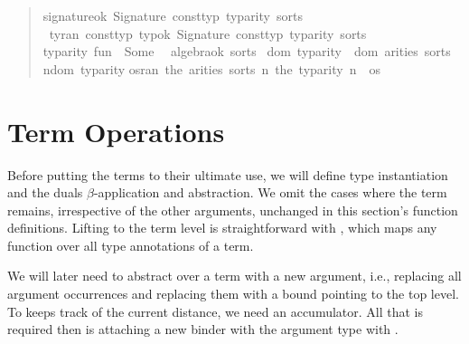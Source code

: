 \begin{quote}
\begin{isabelle}%
 signature{\isacharunderscore}ok\ {\isacharparenleft}Signature\ const{\isacharunderscore}typ\ typ{\isacharunderscore}arity\ sorts{\isacharparenright}\ {\isacharequal}\isanewline
\ {\isacharparenleft}{\isasymforall}ty{\isasymin}ran\ const{\isacharunderscore}typ{\isachardot}\ {\isacharparenleft}typ{\isacharunderscore}ok{\isacharprime}\ {\isacharparenleft}Signature\ const{\isacharunderscore}typ\ typ{\isacharunderscore}arity\ sorts{\isacharparenright}{\isacharparenright}\ {\isasymand}\isanewline
\isaindent{\ }typ{\isacharunderscore}arity\ {\isacharprime}{\isacharprime}fun{\isacharprime}{\isacharprime}\ {\isacharequal}\ Some\ {}\ {\isasymand}\isanewline
\isaindent{\ }algebra{\isacharunderscore}ok\ sorts\ {\isasymand}\isanewline
\isaindent{\ }dom\ typ{\isacharunderscore}arity\ {\isacharequal}\ dom\ {\isacharparenleft}arities\ sorts{\isacharparenright}\ {\isasymand}\isanewline
\isaindent{\ }{\isacharparenleft}{\isasymforall}n{\isasymin}dom\ typ{\isacharunderscore}arity{\isachardot}\isanewline
\isaindent{\ {\isacharparenleft}\ \ \ }{\isasymforall}os{\isasymin}ran\ {\isacharparenleft}the\ {\isacharparenleft}arities\ sorts\ n{\isacharparenright}{\isacharparenright}{\isachardot}\ the\ {\isacharparenleft}typ{\isacharunderscore}arity\ n{\isacharparenright}\ {\isacharequal}\ {\isacharbar}os{\isacharbar}{\isacharparenright}{\isacharparenright}%
\end{isabelle}
\end{quote}

\section{Term Operations}

Before putting the terms to their ultimate use, we will define type instantiation and the duals \(\beta\)-application and abstraction.
We omit the cases where the term remains, irrespective of the other arguments, unchanged in this section's function definitions.
Lifting  to the term level is straightforward with , which maps any function over all type annotations of a term.


We will later need to abstract over a term with a new argument, i.e., replacing all argument occurrences and replacing them with a bound pointing to the top level.
To keeps track of the current distance, we need an accumulator.
All that is required then is attaching a new binder with the argument type with .

